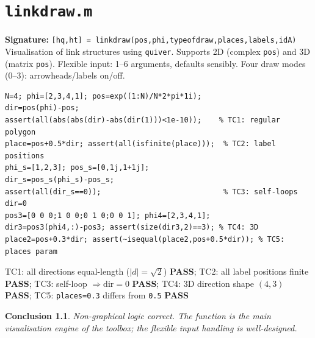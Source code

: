 \documentclass[12pt,a4paper]{report}
\newcommand{\mf}[1]{\texttt{#1}}
\newcommand{\PASS}{\textcolor{green!60!black}{\textbf{PASS}}}
\newtheorem{concl}{Conclusion}[chapter]
\begin{document}
\chapter{\mf{linkdraw.m}}
\begin{tcolorbox}[Abox,title=Analysis]
\textbf{Signature:} \lstinline|[hq,ht] = linkdraw(pos,phi,typeofdraw,places,labels,idA)|\quad
Visualisation of link structures using \mf{quiver}. Supports 2D (complex \mf{pos}) and 3D (matrix \mf{pos}). Flexible input: 1--6 arguments, defaults sensibly. Four draw modes (0--3): arrowheads/labels on/off.
\end{tcolorbox}
\begin{lstlisting}[caption={Tests for linkdraw.m -- non-graphical logic}]
N=4; phi=[2,3,4,1]; pos=exp((1:N)/N*2*pi*1i);
dir=pos(phi)-pos;
assert(all(abs(abs(dir)-abs(dir(1)))<1e-10));    % TC1: regular polygon
place=pos+0.5*dir; assert(all(isfinite(place)));  % TC2: label positions
phi_s=[1,2,3]; pos_s=[0,1j,1+1j];
dir_s=pos_s(phi_s)-pos_s;
assert(all(dir_s==0));                            % TC3: self-loops dir=0
pos3=[0 0 0;1 0 0;0 1 0;0 0 1]; phi4=[2,3,4,1];
dir3=pos3(phi4,:)-pos3; assert(size(dir3,2)==3); % TC4: 3D
place2=pos+0.3*dir; assert(~isequal(place2,pos+0.5*dir)); % TC5: places param
\end{lstlisting}
\begin{tcolorbox}[Pbox,title=TC1--TC5 -- All pass]
TC1: all directions equal-length ($|d|=\sqrt{2}$) \PASS; TC2: all label positions finite \PASS; TC3: self-loop $\Rightarrow\mathrm{dir}=0$ \PASS; TC4: 3D direction shape $(4,3)$ \PASS; TC5: \mf{places=0.3} differs from \mf{0.5} \PASS
\end{tcolorbox}
\begin{concl}
Non-graphical logic correct. The function is the main visualisation engine of the toolbox; the flexible input handling is well-designed.
\end{concl}

\end{document}
